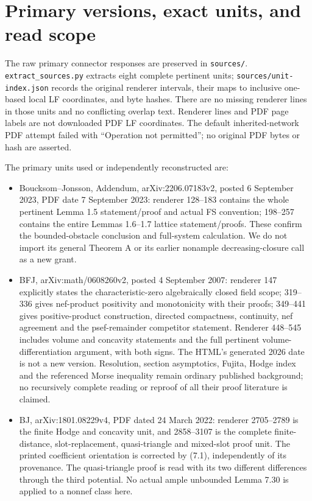 \documentclass[10pt]{article}
\begin{document}
\appendix
\section{Primary versions, exact units, and read scope}
The raw primary connector responses are preserved in \texttt{sources/}.
\texttt{extract\_sources.py} extracts eight complete pertinent units;
\texttt{sources/unit-index.json} records the original renderer intervals,
their maps to inclusive one-based local LF coordinates, and byte hashes.
There are no missing renderer lines in those units and no conflicting
overlap text. Renderer lines and PDF page labels are not downloaded PDF
LF coordinates. The default inherited-network PDF attempt failed with
``Operation not permitted''; no original PDF bytes or hash are asserted.

The primary units used or independently reconstructed are:
\begin{itemize}
\item Boucksom--Jonsson, Addendum, arXiv:2206.07183v2, posted
6 September 2023, PDF date 7 September 2023: renderer 128--183 contains
the whole pertinent Lemma 1.5 statement/proof and actual FS convention;
198--257 contains the entire Lemmas 1.6--1.7 lattice statement/proofs.
These confirm the bounded-obstacle conclusion and full-system
calculation. We do not import its general Theorem A or its earlier
nonample decreasing-closure call as a new grant.
\item BFJ, arXiv:math/0608260v2, posted 4 September 2007: renderer
147 explicitly states the characteristic-zero algebraically closed
field scope; 319--336 gives nef-product positivity and monotonicity
with their proofs; 349--441 gives positive-product construction,
directed compactness, continuity, nef agreement and the psef-remainder
competitor statement. Renderer 448--545 includes volume and concavity
statements and the full pertinent volume-differentiation argument,
with both signs. The HTML's generated 2026 date is not a new version.
Resolution, section asymptotics, Fujita, Hodge index and the referenced
Morse inequality remain ordinary published background; no recursively
complete reading or reproof of all their proof literature is claimed.
\item BJ, arXiv:1801.08229v4, PDF dated 24 March 2022:
renderer 2705--2789 is the finite Hodge and concavity unit, and
2858--3107 is the complete finite-distance, slot-replacement,
quasi-triangle and mixed-slot proof unit. The printed coefficient
orientation is corrected by (7.1), independently of its provenance.
The quasi-triangle proof is read with its two different differences
through the third potential. No actual ample unbounded Lemma 7.30
is applied to a nonnef class here.
\end{itemize}
\end{document}
